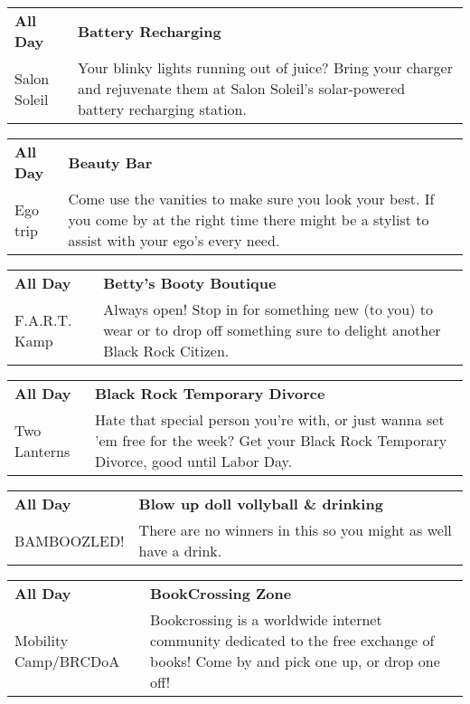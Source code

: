 \begin{tabular}{ p{1in} p{2.2in} }
    \textbf{All Day} & \textbf{Battery Recharging} \\
    Salon Soleil \newline  & Your blinky lights running out of juice? Bring your charger and rejuvenate them at Salon Soleil's solar-powered battery recharging station. \\
    \hline 
\end{tabular}
    
\begin{tabular}{ p{1in} p{2.2in} }
    \textbf{All Day} & \textbf{Beauty Bar} \\
    Ego trip \newline  & Come use the vanities to make sure you look your best. If you come by at the right time there might be a stylist to assist with your ego's every need. \\
    \hline 
\end{tabular}
    
\begin{tabular}{ p{1in} p{2.2in} }
    \textbf{All Day} & \textbf{Betty's Booty Boutique} \\
    F.A.R.T. Kamp \newline  & Always open! Stop in for something new (to you) to wear or to drop off something sure to delight another Black Rock Citizen. \\
    \hline 
\end{tabular}
    
\begin{tabular}{ p{1in} p{2.2in} }
    \textbf{All Day} & \textbf{Black Rock Temporary Divorce} \\
    Two Lanterns \newline  & Hate that special person you're with, or just wanna set 'em free for the
week? Get your Black Rock Temporary Divorce, good until Labor Day. \\
    \hline 
\end{tabular}
    
\begin{tabular}{ p{1in} p{2.2in} }
    \textbf{All Day} & \textbf{Blow up doll vollyball \& drinking} \\
    BAMBOOZLED! \newline  & There are no winners in this so you might as well have a drink. \\
    \hline 
\end{tabular}
    
\begin{tabular}{ p{1in} p{2.2in} }
    \textbf{All Day} & \textbf{BookCrossing Zone} \\
    Mobility Camp/BRCDoA \newline  & Bookcrossing is a worldwide internet community dedicated to the free exchange of books! Come by and pick one up, or drop one off! \\
    \hline 
\end{tabular}
    
